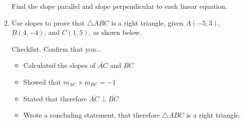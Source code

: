\documentclass[12pt, oneside]{article}
\begin{document}
\begin{enumerate}
\newpage

Find the slope parallel and slope perpendicular to each linear equation.

  \item Use slopes to prove that $\triangle ABC$ is a right triangle, given $A(-5,3)$, $B(4,-4)$, and $C(1,5)$, as shown below.
    \begin{multicols}{2}
      Checklist. Confirm that you...
      \begin{itemize}
        \item Calculated the slopes of $\overline{AC}$ and $\overline{BC}$
        \item Showed that $m_{AC} \times m_{BC} = -1$
        \item Stated that therefore $\overline{AC} \perp \overline{BC}$
        \item Wrote a concluding statement, that therefore $\triangle ABC$ is a right triangle.
      \end{itemize}
    \end{multicols}


\end{enumerate}
\end{document}
